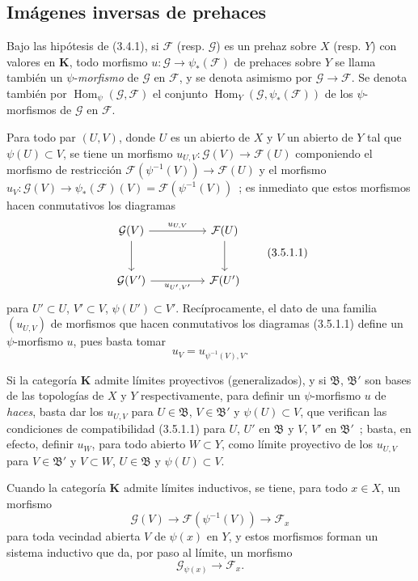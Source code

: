\subsection{Imágenes inversas de prehaces}

\begin{env}[3.5.1]
\label{0.3.5.1-fr}
Bajo las hipótesis de (3.4.1), si $\mathcal{F}$ (resp. $\mathcal{G}$) es un
prehaz sobre $X$ (resp. $Y$) con valores en $\boldsymbol{K}$, todo morfismo
$u:\mathcal{G}\to\psi_*(\mathcal{F})$ de prehaces sobre $Y$ se llama también
un $\psi$-\emph{morfismo} de $\mathcal{G}$ en $\mathcal{F}$, y se denota
asimismo por $\mathcal{G}\to\mathcal{F}$. Se denota también por
$\operatorname{Hom}_\psi(\mathcal{G},\mathcal{F})$ el conjunto
$\operatorname{Hom}_Y(\mathcal{G},\psi_*(\mathcal{F}))$ de los
$\psi$-morfismos de $\mathcal{G}$ en $\mathcal{F}$.

Para todo par $(U,V)$, donde $U$ es un abierto de $X$ y $V$ un abierto de $Y$
tal que $\psi(U)\subset V$, se tiene un morfismo
$u_{U,V}:\mathcal{G}(V)\to\mathcal{F}(U)$ componiendo el morfismo de
restricción
$\mathcal{F}(\psi^{-1}(V))\to\mathcal{F}(U)$ y el morfismo
$u_V:\mathcal{G}(V)\to\psi_*(\mathcal{F})(V)=\mathcal{F}(\psi^{-1}(V))$~; es
inmediato que estos morfismos hacen conmutativos los diagramas
\begin{equation*}
\begin{tikzcd}[column sep=huge,row sep=large]
\mathcal{G}(V) \arrow[r,"u_{U,V}"] \arrow[d]
  & \mathcal{F}(U) \arrow[d] \\
\mathcal{G}(V') \arrow[r,"u_{U',V'}"']
  & \mathcal{F}(U')
\end{tikzcd}
\tag{3.5.1.1}\label{0.3.5.1.1-fr}
\end{equation*}
para $U'\subset U$, $V'\subset V$, $\psi(U')\subset V'$. Recíprocamente, el
dato de una familia $(u_{U,V})$ de morfismos que hacen conmutativos los
diagramas (3.5.1.1) define un $\psi$-morfismo $u$, pues basta tomar
\[
  u_V=u_{\psi^{-1}(V),V}.
\]


Si la categoría $\boldsymbol{K}$ admite límites proyectivos (generalizados), y
si $\mathfrak{B}$, $\mathfrak{B}'$ son bases de las topologías de $X$ y
$Y$ respectivamente, para definir un $\psi$-morfismo $u$ de \emph{haces},
basta dar los $u_{U,V}$ para
$U\in\mathfrak{B}$, $V\in\mathfrak{B}'$ y $\psi(U)\subset V$, que verifican las
condiciones de compatibilidad (3.5.1.1) para $U$, $U'$ en $\mathfrak{B}$ y
$V$, $V'$ en $\mathfrak{B}'$~; basta, en efecto, definir $u_W$, para
todo abierto $W\subset Y$, como límite proyectivo de los $u_{U,V}$ para
$V\in\mathfrak{B}'$ y $V\subset W$, $U\in\mathfrak{B}$ y
$\psi(U)\subset V$.

Cuando la categoría $\boldsymbol{K}$ admite límites inductivos, se tiene, para
todo $x\in X$, un morfismo
\[
  \mathcal{G}(V)\to\mathcal{F}(\psi^{-1}(V))\to\mathcal{F}_x
\]
para toda vecindad abierta $V$ de $\psi(x)$ en $Y$, y estos morfismos
forman un sistema inductivo que da, por paso al límite, un morfismo
\[
  \mathcal{G}_{\psi(x)}\to\mathcal{F}_x.
\]
\end{env}
